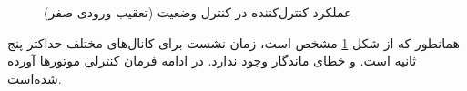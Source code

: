 \documentclass{CCI2020}
\begin{document}
		\begin{figure}[H]
			\centering
			\caption{عملکرد کنترل‌کننده  در کنترل وضعیت (تعقیب ورودی صفر)}
			\label{lqidg_roll_pitch_yaw_fig_simulation_ll}
		\end{figure}
	 همانطور که از شکل
		\ref{lqidg_roll_pitch_yaw_fig_simulation_ll}
		مشخص است، زمان نشست برای کانال‌های مختلف حداکثر پنج ثانیه است. و خطای ماندگار وجود ندارد. در ادامه فرمان کنترلی موتورها آورده شده‌است.
		
\end{document}
